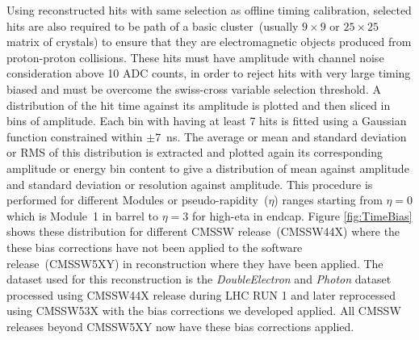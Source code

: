 Using reconstructed hits with same selection as offline timing calibration, selected hits are also required to be path of a basic cluster~(usually $9\times 9 $ or $25\times 25$ matrix of crystals) to ensure that they are electromagnetic objects produced from proton-proton collisions. These hits must have amplitude with channel noise consideration above 10 ADC counts, in order to reject hits with very large timing biased and must be overcome the swiss-cross variable selection threshold. A distribution of the hit time against its amplitude is plotted and then sliced in bins of amplitude. Each bin with having at least 7 hits is fitted using a Gaussian function constrained within $\pm 7$~ns. The average or mean and standard deviation or RMS of this distribution is extracted and plotted again its corresponding amplitude or energy bin content to give a distribution of mean against amplitude and standard deviation or resolution against amplitude. This procedure is performed for different Modules or pseudo-rapidity~($\eta$) ranges starting from $\eta = 0$ which is Module~1 in barrel to $\eta = 3$ for high-eta in endcap.
Figure \ref{fig:TimeBias} shows these distribution for different CMSSW release~(CMSSW44X) where the these bias corrections have not been applied to the software release~(CMSSW5XY) in reconstruction where they have been applied. The dataset used for this reconstruction is the \textit{DoubleElectron} and \textit{Photon} dataset processed using CMSSW44X release during LHC RUN 1 and later reprocessed using CMSSW53X with the bias corrections we developed applied. All CMSSW releases beyond CMSSW5XY now have these bias corrections applied. 

